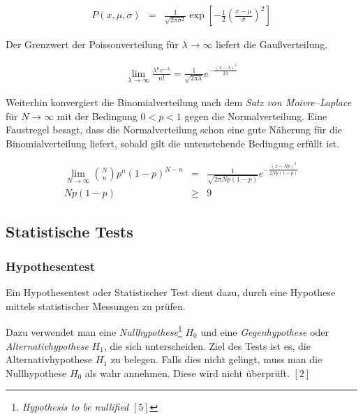\documentclass[12pt,a4paper]{scrartcl}
\numberwithin{equation}{section} %
\renewcommand{\[}{} %
\renewcommand{\]}{\noindent} %
\begin{document}
\begin{eqnarray}
	P(x,\mu,\sigma) &=& \frac{1}{\sqrt{2 \pi\sigma^2}} \exp\left[- \frac{1}{2} \left(\frac{x - \mu}{\sigma}\right)^2\right]
\end{eqnarray}

\noindent
Der Grenzwert der Poissonverteilung für $\lambda \rightarrow \infty$ liefert die Gaußverteilung.

\begin{eqnarray}
	\lim_{\lambda \rightarrow \infty} \frac{\lambda^n e^{-\lambda}}{n!} = \frac{1}{\sqrt{2 \pi \lambda}} e^{- \frac{(x-\lambda)^2}{2\lambda}}
\end{eqnarray}

\noindent
Weiterhin konvergiert die Binomialverteilung nach dem \emph{Satz von Moivre--Laplace} für $N \rightarrow \infty$ mit der Bedingung $0 < p < 1$ gegen die Normalverteilung. Eine Faustregel besagt, dass die Normalverteilung schon eine gute Näherung für die Binomialverteilung liefert, sobald gilt die untenstehende Bedingung erfüllt ist.

\begin{eqnarray}
	\lim_{N \rightarrow \infty} \binom{N}{n} p^n (1-p)^{N-n}
		&=& \frac{1}{\sqrt{2 \pi N p (1-p)}} e^{- \frac{(x - Np)^2}{2 N p (1-p)}} \\
	Np (1-p) &\geq& 9
\end{eqnarray}

\hypertarget{statistische-tests}{%
\subsection{Statistische Tests}\label{statistische-tests}}

\hypertarget{hypothesentest}{%
\subsubsection{Hypothesentest}\label{hypothesentest}}

Ein Hypothesentest oder Statistischer Test dient dazu, durch eine
Hypothese mittels statistischer Messungen zu prüfen.

Dazu verwendet man eine \emph{Nullhypothese}\footnote{\emph{Hypothesis
  to be nullified} \([5]\)} \(H_0\) und eine \emph{Gegenhypothese} oder
\emph{Alternativhypothese} \(H_1\), die sich unterscheiden. Ziel des
Tests ist es, die Alternativhypothese \(H_1\) zu belegen. Falls dies
nicht gelingt, muss man die Nullhypothese \(H_0\) als wahr annehmen.
Diese wird nicht überprüft. \([2]\)
\end{document}

